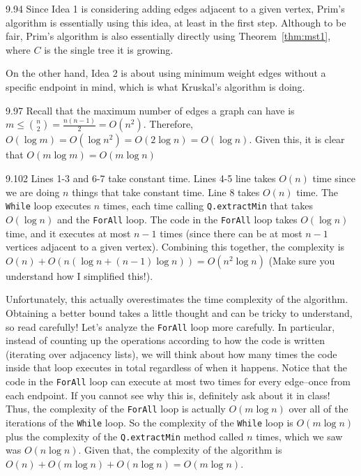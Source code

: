 \begin{Answer}{9.94}
Since Idea 1 is considering adding edges adjacent to a given vertex,
Prim's algorithm is essentially using this idea, at least in the first step.
Although to be fair, Prim's algorithm is also essentially directly using
Theorem~\ref{thm:mst1}, where $C$ is the single tree it is growing.

On the other hand, Idea 2 is about using minimum weight edges
without a specific endpoint in mind, which is what Kruskal's
algorithm is doing.
\end{Answer}
\begin{Answer}{9.97}
Recall that the maximum number of edges a graph can have is
$m\leq \binom{n}{2}=\frac{n(n-1)}{2}=O(n^2)$.
Therefore, $O(\log m)=O( \log n^2)=O(2\log n)=O(\log n)$.
Given this, it is clear that $O(m\log m)=O(m\log n)$
\end{Answer}
\begin{Answer}{9.102}
Lines 1-3 and  6-7 take constant time.
Lines 4-5 line takes $O(n)$ time since we are doing $n$ things
that take constant time.
Line 8 takes $O(n)$ time.
The \verb+While+ loop executes $n$ times,
each time calling \verb+Q.extractMin+ that takes $O(\log n)$
and the \verb+ForAll+ loop.
The code in the \verb+ForAll+ loop takes $O(\log n)$
time, and it executes at most $n-1$ times (since there can be
at most $n-1$ vertices adjacent to a given vertex).
Combining this together, the complexity is
$O(n)+O(n(\log n + (n-1)\log n))=O(n^2\log n)$
(Make sure you understand how I simplified this!).

Unfortunately, this actually overestimates the time complexity
of the algorithm.
Obtaining a better bound takes a little thought and can be tricky
to understand, so read carefully!
Let's analyze the \verb+ForAll+ loop
more carefully. In particular, instead of counting up the operations
according to how the code is written (iterating over adjacency lists),
we will think about how many times the code inside that
loop executes in total regardless of when it happens.
Notice that the code in the \verb+ForAll+ loop
can execute at most two times for every edge--once from each
endpoint. If you cannot see why this is, definitely ask about it in class!
Thus, the complexity of the \verb+ForAll+ loop
is actually $O(m\log n)$ over all of the iterations of the
\verb+While+ loop. So the complexity of the \verb+While+
loop is $O(m\log n)$ plus the complexity of the \verb+Q.extractMin+ method called $n$ times, which we saw was $O(n\log n)$.
Given that, the complexity of the algorithm is
$O(n)+O(m\log n)+O(n\log n)=O(m\log n)$.
\end{Answer}
